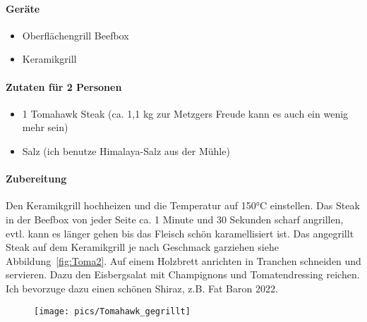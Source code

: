 \paragraph{Geräte}

\begin{itemize}[noitemsep]
	\item Oberflächengrill Beefbox
	\item Keramikgrill
\end{itemize}

\paragraph{Zutaten für 2 Personen}

\begin{itemize}[noitemsep]
	\item 1 Tomahawk Steak (ca. 1,1 kg zur Metzgers Freude kann es auch ein 
	wenig mehr sein)
	\item Salz (ich benutze Himalaya-Salz aus der Mühle)
\end{itemize}

\paragraph{Zubereitung}

Den Keramikgrill hochheizen und die Temperatur auf 150°C einstellen.
Das Steak in der Beefbox von jeder Seite ca. 1 Minute und 30 Sekunden scharf 
angrillen, evtl. kann es länger gehen bis das Fleisch schön karamellisiert ist.
Das angegrillt Steak auf dem Keramikgrill je nach Geschmack garziehen siehe 
Abbildung~\vref{fig:Toma2}. Auf einem Holzbrett anrichten in Tranchen 
schneiden und servieren.
Dazu den Eisbergsalat mit Champignons und Tomatendressing reichen.
Ich bevorzuge dazu einen schönen Shiraz, z.B. Fat Baron 2022.
\newpage

\begin{figure}[htpb]
	\centering
	\begin{minipage}{1\textwidth}
	\centering	
	\texttt{[image: pics/Tomahawk\_gegrillt]}
	\label{fig:Toma2}
	\end{minipage}
\end{figure}
\newpage



